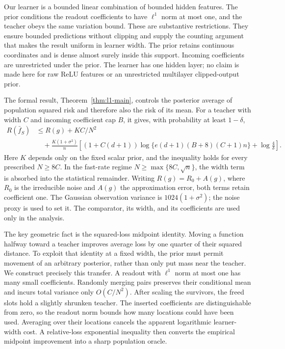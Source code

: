 \documentclass[11pt]{article}
\begin{document}
Our learner is a bounded linear combination of bounded hidden features. The prior conditions the readout coefficients to have $\ell^1$ norm at most one, and the teacher obeys the same variation bound. These are substantive restrictions. They ensure bounded predictions without clipping and supply the counting argument that makes the result uniform in learner width. The prior retains continuous coordinates and is dense almost surely inside this support. Incoming coefficients are unrestricted under the prior. The learner has one hidden layer; no claim is made here for raw ReLU features or an unrestricted multilayer clipped-output prior.

The formal result, Theorem~\ref{thm:l1-main}, controls the posterior average of population squared risk and therefore also the risk of its mean. For a teacher with width $C$ and incoming coefficient cap $B$, it gives, with probability at least $1-\delta$,
\[
 \begin{aligned}
 R(\bar f_S)&\le R(g)+K C/N^2\\
 &\quad+\frac{K(1+\sigma^2)}n
 \left[(1+C(d+1))\log\{e(d+1)(B+8)(C+1)n\}
                                      +\log\frac4\delta\right].
 \end{aligned}
\]
Here $K$ depends only on the fixed scalar prior, and the inequality holds for every prescribed $N\ge8C$. In the fast-rate regime $N\ge\max\{8C,\sqrt n\}$, the width term is absorbed into the statistical remainder. Writing $R(g)=R_0+A(g)$, where $R_0$ is the irreducible noise and $A(g)$ the approximation error, both terms retain coefficient one. The Gaussian observation variance is $1024(1+\sigma^2)$; the noise proxy is used to set it. The comparator, its width, and its coefficients are used only in the analysis.

The key geometric fact is the squared-loss midpoint identity. Moving a function halfway toward a teacher improves average loss by one quarter of their squared distance. To exploit that identity at a fixed width, the prior must permit movement of an arbitrary posterior, rather than only put mass near the teacher. We construct precisely this transfer. A readout with $\ell^1$ norm at most one has many small coefficients. Randomly merging pairs preserves their conditional mean and incurs total variance only $O(C/N^2)$. After scaling the survivors, the freed slots hold a slightly shrunken teacher. The inserted coefficients are distinguishable from zero, so the readout norm bounds how many locations could have been used. Averaging over their locations cancels the apparent logarithmic learner-width cost. A relative-loss exponential inequality then converts the empirical midpoint improvement into a sharp population oracle.
\end{document}
